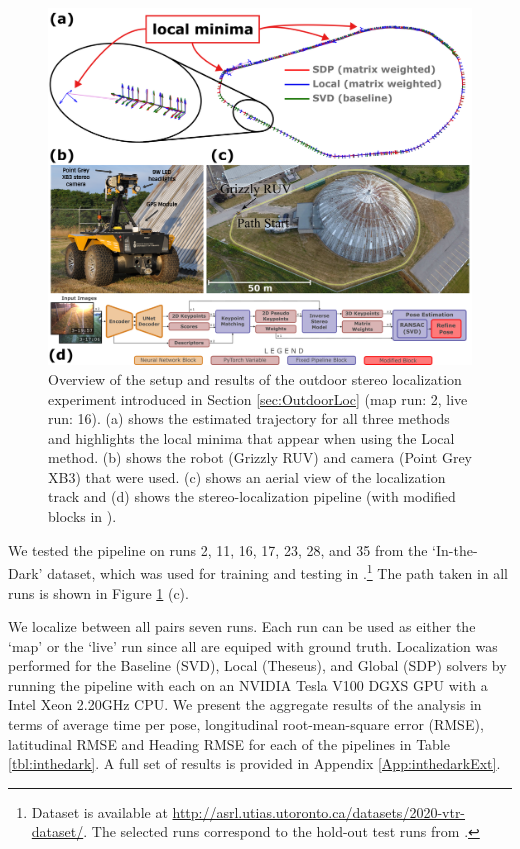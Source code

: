 \documentclass[lettersize,journal]{IEEEtran}
\begin{document}
{\begin{figure}[]
	\centering
	\includegraphics[width=\columnwidth]{figs/in-the-dark-traj.png}
	\caption{Overview of the setup and results of the outdoor stereo localization experiment introduced in Section \ref{sec:OutdoorLoc} (map run: 2, live run: 16). (a) shows the estimated trajectory for all three methods and highlights the local minima that appear when using the Local method. (b) shows the robot (Grizzly RUV) and camera (Point Grey XB3) that were used. (c) shows an aerial view of the localization track and (d) shows the stereo-localization pipeline (with modified blocks in \color{red}{red}).}
	\label{fig:inthedark}
\end{figure}

We tested the pipeline on runs 2, 11, 16, 17, 23, 28, and 35 from the `In-the-Dark' dataset, which was used for training and testing in \cite{gridsethKeepingEyeThings2022}.\footnote{Dataset is available at \url{http://asrl.utias.utoronto.ca/datasets/2020-vtr-dataset/}. The selected runs correspond to the hold-out test runs from \cite{gridsethKeepingEyeThings2022}.} The path taken in all runs is shown in Figure \ref{fig:inthedark} (c). 

We localize between all pairs seven runs. Each run can be used as either the `map' or the `live' run since all are equiped with ground truth. Localization was performed for the Baseline (SVD), Local (Theseus), and Global (SDP) solvers by running the pipeline with each on an NVIDIA Tesla V100 DGXS GPU with a Intel Xeon 2.20GHz CPU. We present the aggregate results of the analysis in terms of average time per pose, longitudinal root-mean-square error (RMSE), latitudinal RMSE and Heading RMSE for each of the pipelines in Table \ref{tbl:inthedark}. A full set of results is provided in Appendix \ref{App:inthedarkExt}.

}
\end{document}

